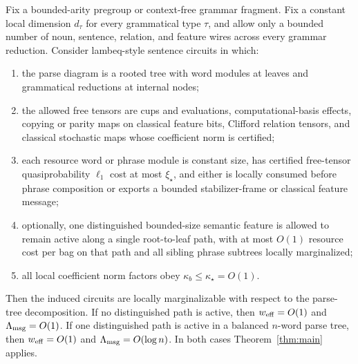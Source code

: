 \begin{proposition}
\label{prop:certified-lambeq-family}
Fix a bounded-arity pregroup or context-free grammar fragment. Fix a constant local dimension \(d_\tau\) for every grammatical type \(\tau\), and allow only a bounded number of noun, sentence, relation, and feature wires across every grammar reduction. Consider lambeq-style sentence circuits in which:
\begin{enumerate}[leftmargin=1.2cm]
\item the parse diagram is a rooted tree with word modules at leaves and grammatical reductions at internal nodes;
\item the allowed free tensors are cups and evaluations, computational-basis effects, copying or parity maps on classical feature bits, Clifford relation tensors, and classical stochastic maps whose coefficient norm is certified;
\item each resource word or phrase module is constant size, has certified free-tensor quasiprobability \(\ell_1\) cost at most \(\xi_\star\), and either is locally consumed before phrase composition or exports a bounded stabilizer-frame or classical feature message;
\item optionally, one distinguished bounded-size semantic feature is allowed to remain active along a single root-to-leaf path, with at most \(O(1)\) resource cost per bag on that path and all sibling phrase subtrees locally marginalized;
\item all local coefficient norm factors obey \(\kappa_b\le \kappa_\star=O(1)\).
\end{enumerate}
Then the induced circuits are locally marginalizable with respect to the parse-tree decomposition. If no distinguished path is active, then \(w_{\mathrm{eff}}=O(1)\) and \(\Lambda_{\mathrm{msg}}=O(1)\). If one distinguished path is active in a balanced \(n\)-word parse tree, then \(w_{\mathrm{eff}}=O(1)\) and \(\Lambda_{\mathrm{msg}}=O(\log n)\). In both cases Theorem~\ref{thm:main} applies.
\end{proposition}

